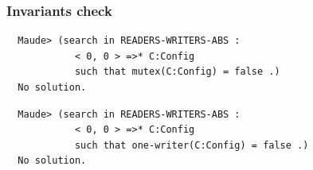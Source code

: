 \documentclass[xcolor=dvipsnames,10pt]{beamer}
\begin{document}
\begin{frame}[fragile]
  \frametitle{Invariants check}

\begin{scriptsize}
\begin{verbatim}
  Maude> (search in READERS-WRITERS-ABS :
            < 0, 0 > =>* C:Config 
            such that mutex(C:Config) = false .)
  No solution.
\end{verbatim}
\end{scriptsize}

\begin{scriptsize}
\begin{verbatim}
  Maude> (search in READERS-WRITERS-ABS :
            < 0, 0 > =>* C:Config 
            such that one-writer(C:Config) = false .)
  No solution.
\end{verbatim}
\end{scriptsize}
\end{frame}


\end{document}
